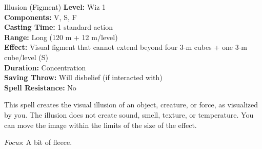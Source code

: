 {Illusion (Figment)}
{
	\textbf{Level:}
	Wiz 1\\
	\textbf{Components:}
	V, S, F\\
	\textbf{Casting Time:}
	1 standard action\\
	\textbf{Range:}
	Long (120 m + 12 m/level)\\
	\textbf{Effect:}
	Visual figment that cannot extend beyond four 3-m cubes + one 3-m cube/level (S)\\
	\textbf{Duration:}
	Concentration\\
	\textbf{Saving Throw:}
	Will disbelief (if interacted with)\\
	\textbf{Spell Resistance:}
	No\\
}
{
	This spell creates the visual illusion of an object, creature, or force, as visualized by you. The illusion does not create sound, smell, texture, or temperature. You can move the image within the limits of the size of the effect.

	\textit{Focus}:
	A bit of fleece.

}
